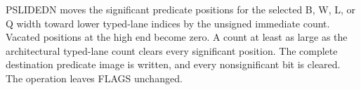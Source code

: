 PSLIDEDN moves the significant predicate positions for the selected B, W, L, or Q width toward lower typed-lane indices by the unsigned immediate count.
Vacated positions at the high end become zero.
A count at least as large as the architectural typed-lane count clears every significant position.
The complete destination predicate image is written, and every nonsignificant bit is cleared.
The operation leaves FLAGS unchanged.
